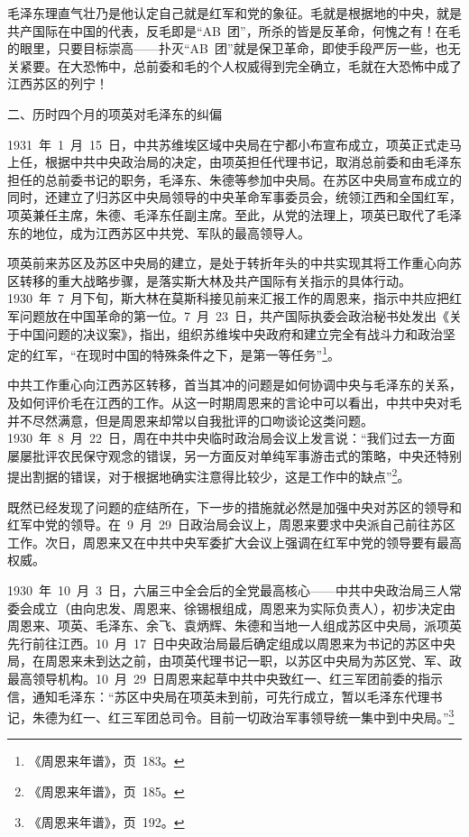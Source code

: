 毛泽东理直气壮乃是他认定自己就是红军和党的象征。毛就是根据地的中央，就是共产国际在中国的代表，反毛即是“AB~团”，所杀的皆是反革命，何愧之有！在毛的眼里，只要目标崇高——扑灭“AB~团”就是保卫革命，即使手段严厉一些，也无关紧要。在大恐怖中，总前委和毛的个人权威得到完全确立，毛就在大恐怖中成了江西苏区的列宁！

二、历时四个月的项英对毛泽东的纠偏

1931~年~1~月~15~日，中共苏维埃区域中央局在宁都小布宣布成立，项英正式走马上任，根据中共中央政治局的决定，由项英担任代理书记，取消总前委和由毛泽东担任的总前委书记的职务，毛泽东、朱德等参加中央局。在苏区中央局宣布成立的同时，还建立了归苏区中央局领导的中央革命军事委员会，统领江西和全国红军，项英兼任主席，朱德、毛泽东任副主席。至此，从党的法理上，项英已取代了毛泽东的地位，成为江西苏区中共党、军队的最高领导人。

项英前来苏区及苏区中央局的建立，是处于转折年头的中共实现其将工作重心向苏区转移的重大战略步骤，是落实斯大林及共产国际有关指示的具体行动。1930~年~7~月下旬，斯大林在莫斯科接见前来汇报工作的周恩来，指示中共应把红军问题放在中国革命的第一位。7~月~23~日，共产国际执委会政治秘书处发出《关于中国问题的决议案》，指出，组织苏维埃中央政府和建立完全有战斗力和政治坚定的红军，“在现时中国的特殊条件之下，是第一等任务”\footnote{《周恩来年谱》，页~183。}。

中共工作重心向江西苏区转移，首当其冲的问题是如何协调中央与毛泽东的关系，及如何评价毛在江西的工作。从这一时期周恩来的言论中可以看出，中共中央对毛并不尽然满意，但是周恩来却常以自我批评的口吻谈论这类问题。1930~年~8~月~22~日，周在中共中央临时政治局会议上发言说：“我们过去一方面屡屡批评农民保守观念的错误，另一方面反对单纯军事游击式的策略，中央还特别提出割据的错误，对于根据地确实注意得比较少，这是工作中的缺点”\footnote{《周恩来年谱》，页~185。}。

既然已经发现了问题的症结所在，下一步的措施就必然是加强中央对苏区的领导和红军中党的领导。在~9~月~29~日政治局会议上，周恩来要求中央派自己前往苏区工作。次日，周恩来又在中共中央军委扩大会议上强调在红军中党的领导要有最高权威。

1930~年~10~月~3~日，六届三中全会后的全党最高核心——中共中央政治局三人常委会成立（由向忠发、周恩来、徐锡根组成，周恩来为实际负责人），初步决定由周恩来、项英、毛泽东、余飞、袁炳辉、朱德和当地一人组成苏区中央局，派项英先行前往江西。10~月~17~日中央政治局最后确定组成以周恩来为书记的苏区中央局，在周恩来未到达之前，由项英代理书记一职，以苏区中央局为苏区党、军、政最高领导机构。10~月~29~日周恩来起草中共中央致红一、红三军团前委的指示信，通知毛泽东：“苏区中央局在项英未到前，可先行成立，暂以毛泽东代理书记，朱德为红一、红三军团总司令。目前一切政治军事领导统一集中到中央局。”\footnote{《周恩来年谱》，页~192。}

